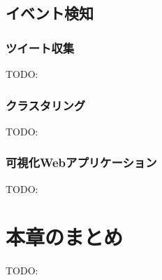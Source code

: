 \subsection{イベント検知}
\subsubsection{ツイート収集}
TODO:
\subsubsection{クラスタリング}
TODO:

\subsubsection{可視化Webアプリケーション}
TODO:

\newpage

\section{本章のまとめ}
TODO:




\newpage
